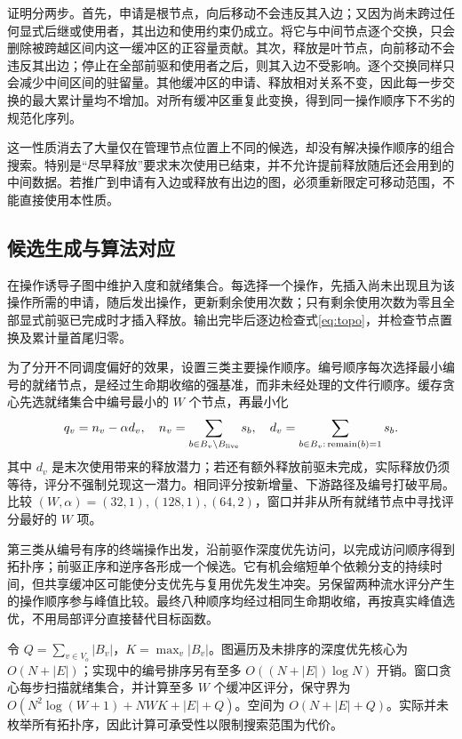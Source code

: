 证明分两步。首先，申请是根节点，向后移动不会违反其入边；又因为尚未跨过任何显式后继或使用者，其出边和使用约束仍成立。将它与中间节点逐个交换，只会删除被跨越区间内这一缓冲区的正容量贡献。其次，释放是叶节点，向前移动不会违反其出边；停止在全部前驱和使用者之后，则其入边不受影响。逐个交换同样只会减少中间区间的驻留量。其他缓冲区的申请、释放相对关系不变，因此每一步交换的最大累计量均不增加。对所有缓冲区重复此变换，得到同一操作顺序下不劣的规范化序列。

这一性质消去了大量仅在管理节点位置上不同的候选，却没有解决操作顺序的组合搜索。特别是“尽早释放”要求末次使用已结束，并不允许提前释放随后还会用到的中间数据。若推广到申请有入边或释放有出边的图，必须重新限定可移动范围，不能直接使用本性质。

\subsection{候选生成与算法对应}
在操作诱导子图中维护入度和就绪集合。每选择一个操作，先插入尚未出现且为该操作所需的申请，随后发出操作，更新剩余使用次数；只有剩余使用次数为零且全部显式前驱已完成时才插入释放。输出完毕后逐边检查式\eqref{eq:topo}，并检查节点置换及累计量首尾归零。

为了分开不同调度偏好的效果，设置三类主要操作顺序。编号顺序每次选择最小编号的就绪节点，是经过生命期收缩的强基准，而非未经处理的文件行顺序。缓存贪心先选就绪集合中编号最小的 $W$ 个节点，再最小化
\begin{equation}
q_v=n_v-\alpha d_v,\quad
n_v=\sum_{b\in B_v\setminus B_{\rm live}}s_b,\quad
d_v=\sum_{b\in B_v:\,\operatorname{remain}(b)=1}s_b.\label{eq:greedy}
\end{equation}
其中 $d_v$ 是末次使用带来的释放潜力；若还有额外释放前驱未完成，实际释放仍须等待，评分不强制兑现这一潜力。相同评分按新增量、下游路径及编号打破平局。比较 $(W,\alpha)=(32,1),(128,1),(64,2)$，窗口并非从所有就绪节点中寻找评分最好的 $W$ 项。

第三类从编号有序的终端操作出发，沿前驱作深度优先访问，以完成访问顺序得到拓扑序；前驱正序和逆序各形成一个候选。它有机会缩短单个依赖分支的持续时间，但共享缓冲区可能使分支优先与复用优先发生冲突。另保留两种流水评分产生的操作顺序参与峰值比较。最终八种顺序均经过相同生命期收缩，再按真实峰值选优，不用局部评分直接替代目标函数。

令 $Q=\sum_{v\in V_o}|B_v|$，$K=\max_v|B_v|$。图遍历及未排序的深度优先核心为 $O(N+|E|)$；实现中的编号排序另有至多 $O((N+|E|)\log N)$ 开销。窗口贪心每步扫描就绪集合，并计算至多 $W$ 个缓冲区评分，保守界为 $O(N^2\log(W+1)+NWK+|E|+Q)$。空间为 $O(N+|E|+Q)$。实际并未枚举所有拓扑序，因此计算可承受性以限制搜索范围为代价。


